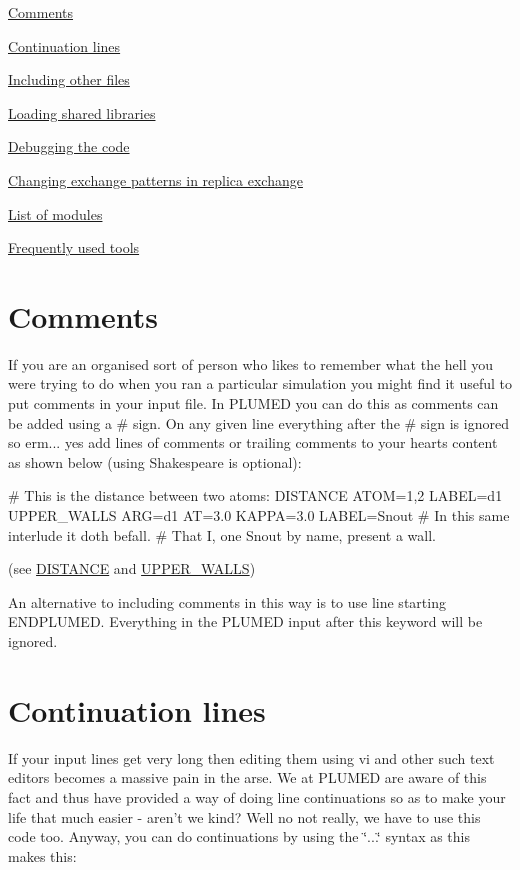 
\begin{DoxyItemize}
\item \hyperlink{comments}{Comments}
\item \hyperlink{ContinuationLines}{Continuation lines}
\item \hyperlink{includes}{Including other files}
\item \hyperlink{load}{Loading shared libraries}
\item \hyperlink{degub}{Debugging the code}
\item \hyperlink{exchange-patterns}{Changing exchange patterns in replica exchange}
\item \hyperlink{mymodules}{List of modules}
\item \hyperlink{misc}{Frequently used tools} 
\end{DoxyItemize}\hypertarget{comments}{}\section{Comments}\label{comments}
If you are an organised sort of person who likes to remember what the hell you were trying to do when you ran a particular simulation you might find it useful to put comments in your input file. In P\+L\+U\+M\+E\+D you can do this as comments can be added using a \# sign. On any given line everything after the \# sign is ignored so erm... yes add lines of comments or trailing comments to your hearts content as shown below (using Shakespeare is optional)\+:

\begin{DoxyVerb}# This is the distance between two atoms:
DISTANCE ATOM=1,2 LABEL=d1
UPPER_WALLS ARG=d1 AT=3.0 KAPPA=3.0 LABEL=Snout # In this same interlude it doth befall.
# That I, one Snout by name, present a wall.
\end{DoxyVerb}
 (see \hyperlink{DISTANCE}{D\+I\+S\+T\+A\+N\+C\+E} and \hyperlink{UPPER_WALLS}{U\+P\+P\+E\+R\+\_\+\+W\+A\+L\+L\+S})

An alternative to including comments in this way is to use line starting E\+N\+D\+P\+L\+U\+M\+E\+D. Everything in the P\+L\+U\+M\+E\+D input after this keyword will be ignored. \hypertarget{ContinuationLines}{}\section{Continuation lines}\label{ContinuationLines}
If your input lines get very long then editing them using vi and other such text editors becomes a massive pain in the arse. We at P\+L\+U\+M\+E\+D are aware of this fact and thus have provided a way of doing line continuations so as to make your life that much easier -\/ aren't we kind? Well no not really, we have to use this code too. Anyway, you can do continuations by using the \char`\"{}...\char`\"{} syntax as this makes this\+:

